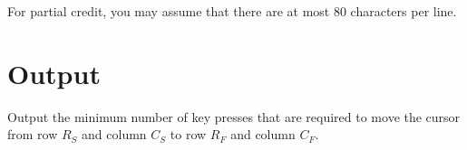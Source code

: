 For partial credit, you may assume that there are at most $80$ characters per line.

\section*{Output}
Output the minimum number of key presses that are required to move the cursor from row $R_S$ and
column $C_S$ to row $R_F$ and column $C_F$.
